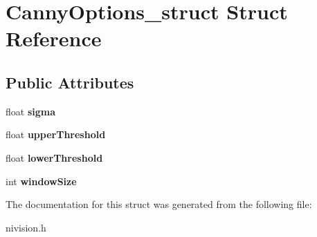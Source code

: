 \hypertarget{structCannyOptions__struct}{\section{\-Canny\-Options\-\_\-struct \-Struct \-Reference}
\label{structCannyOptions__struct}
}
\subsection*{\-Public \-Attributes}
\begin{DoxyCompactItemize}
\item 
\hypertarget{structCannyOptions__struct_a46bcb2c1ee23c48837d3ec31223e0d8e}{float {\bfseries sigma}}\label{structCannyOptions__struct_a46bcb2c1ee23c48837d3ec31223e0d8e}

\item 
\hypertarget{structCannyOptions__struct_a7620b3673f006ab4a486049818d17862}{float {\bfseries upper\-Threshold}}\label{structCannyOptions__struct_a7620b3673f006ab4a486049818d17862}

\item 
\hypertarget{structCannyOptions__struct_abea52e0faa61852bf00ae0787a3e5786}{float {\bfseries lower\-Threshold}}\label{structCannyOptions__struct_abea52e0faa61852bf00ae0787a3e5786}

\item 
\hypertarget{structCannyOptions__struct_a542a198a0eff77a34f291d91ac8f817c}{int {\bfseries window\-Size}}\label{structCannyOptions__struct_a542a198a0eff77a34f291d91ac8f817c}

\end{DoxyCompactItemize}


\-The documentation for this struct was generated from the following file\-:\begin{DoxyCompactItemize}
\item 
nivision.\-h\end{DoxyCompactItemize}
